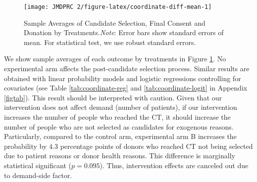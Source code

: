 \documentclass[12pt, a4paper]{article}
\begin{document}
\begin{figure}[t]
\texttt{[image: JMDPRC~2/figure-latex/coordinate-diff-mean-1]} \caption{Sample Averages of Candidate Selection, Final Consent and Donation by Treatments.\newline \emph{Note}: Error bars show standard errors of mean. For statistical test, we use robust standard errors.}\label{fig:coordinate-diff-mean}
\end{figure}

We show sample averages of each outcome by treatments in Figure \ref{fig:coordinate-diff-mean}. No experimental arm affects the post-candidate selection process. Similar results are obtained with linear probability models and logistic regressions controlling for covariates (see Table \ref{tab:coordinate-reg} and \ref{tab:coordinate-logit} in Appendix \ref{figtab}). This result should be interpreted with caution. Given that our intervention does not affect demand (number of patients), if our intervention increases the number of people who reached the CT, it should increase the number of people who are not selected as candidates for exogenous reasons. Particularly, compared to the control arm, experimental arm B increases the probability by \(4.3\) percentage points of donors who reached CT not being selected due to patient reasons or donor health reasons. This difference is marginally statistical significant (\(p = 0.095\)). Thus, intervention effects are canceled out due to demand-side factor.
\end{document}
